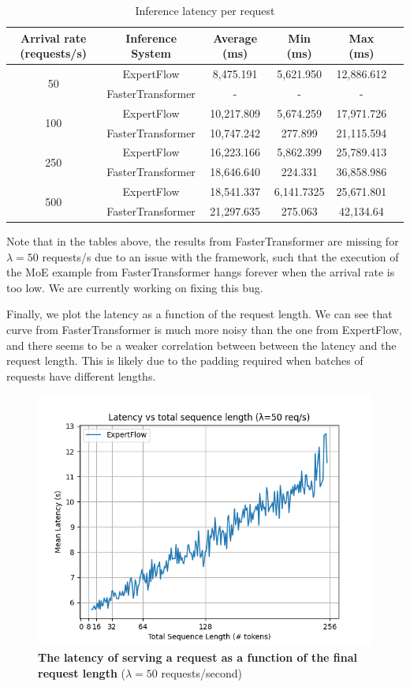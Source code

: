 \begin{table}[H]
\caption{Inference latency per request}
\label{tab:conv-perf-detail}
\centering
\begin{tabular}{c|c|cccc}
\toprule
  Arrival rate (requests/s)  & Inference System & \textbf{Average (ms)}  & \textbf{Min (ms)} & \textbf{Max (ms)} \\
\midrule
\multirow{2}{*}{50} & ExpertFlow & 8,475.191 & 5,621.950 & 12,886.612 \\
                    & FasterTransformer & - & - &  -   \\
\midrule
\multirow{2}{*}{100}  & ExpertFlow & 10,217.809 & 5,674.259 & 17,971.726  \\
 & FasterTransformer & 10,747.242   & 277.899 & 21,115.594  \\
\midrule
\multirow{2}{*}{250}  & ExpertFlow & 16,223.166 & 5,862.399 & 25,789.413  \\
 & FasterTransformer & 18,646.640   & 224.331 & 36,858.986  \\
\midrule
\multirow{2}{*}{500}  & ExpertFlow & 18,541.337 & 6,141.7325 & 25,671.801  \\
 & FasterTransformer & 21,297.635   & 275.063 & 42,134.64  \\
\bottomrule
\end{tabular}
\end{table}

Note that in the tables above, the results from FasterTransformer are missing for $\lambda=50$ requests/s due to an issue with the framework, such that the execution of the MoE example from FasterTransformer hangs forever when the arrival rate is too low. We are currently working on fixing this bug.

Finally, we plot the latency as a function of the request length. We can see that curve from FasterTransformer is much more noisy than the one from ExpertFlow, and there seems to be a weaker correlation between between the latency and the request length. This is likely due to the padding required when batches of requests have different lengths. 

\begin{figure}[H]
    \centering
    \includegraphics[width=0.6\linewidth]{figures/rate50.png}
    \caption{\textbf{The latency of serving a request as a function of the final request length} ($\lambda=50$ requests/second)}
    \label{fig:rate50}
\end{figure}

